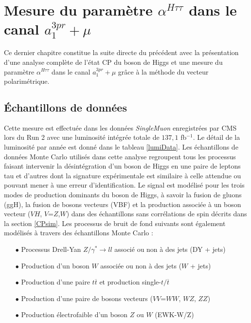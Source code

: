 \chapter{Mesure du paramètre $\alpha^{H\tau\tau}$ dans le canal $a^{3pr}_1+\mu$}
\label{analysis}

Ce dernier chapitre constitue la suite directe du précédent avec la présentation d'une analyse complète de l'état CP du boson de Higgs et une mesure du paramètre $\alpha^{H\tau\tau}$ dans le canal $a^{3pr}_1+\mu$ grâce à la méthode du vecteur polarimétrique. 

\section{Échantillons de données}

Cette mesure est effectuée dans les données \textit{SingleMuon} enregistrées par CMS lors du Run 2 avec une luminosité intégrée totale de $137,1$ fb$^{-1}$. Le détail de la luminosité par année est donné dans le tableau \ref{lumiData}. Les échantillons de données Monte Carlo utilisés dans cette analyse regroupent tous les processus faisant intervenir la désintégration d'un boson de Higgs en une paire de leptons tau et d'autres dont la signature expérimentale est similaire à celle attendue ou pouvant mener à une erreur d'identification. Le signal est modélisé pour les trois modes de production dominants du boson de Higgs, à savoir la fusion de gluons (ggH), la fusion de bosons vecteurs (VBF) et la production associée à un boson vecteur ($VH$, $V$=$Z$,$W$) dans des échantillons sans corrélations de spin décrits dans la section \ref{CPsim}. Les processus de bruit de fond suivants sont également modélisés à travers des échantillons Monte Carlo : \\

\begin{itemize}
    \item[$\bullet$] Processus Drell-Yan $Z/\gamma^*\rightarrow ll$ associé ou non à des jets (DY + jets)
    \medskip
    \item[$\bullet$] Production d'un boson $W$ associée ou non à des jets ($W$ + jets)
    \medskip
    \item[$\bullet$] Production d'une paire $t\overline{t}$ et production single-$t/\overline{t}$
    \medskip
    \item[$\bullet$] Production d'une paire de bosons vecteurs ($VV$=$WW$, $WZ$, $ZZ$)
    \medskip
    \item[$\bullet$] Production électrofaible d'un boson $Z$ ou $W$ (EWK-W/Z)\\
\end{itemize}

